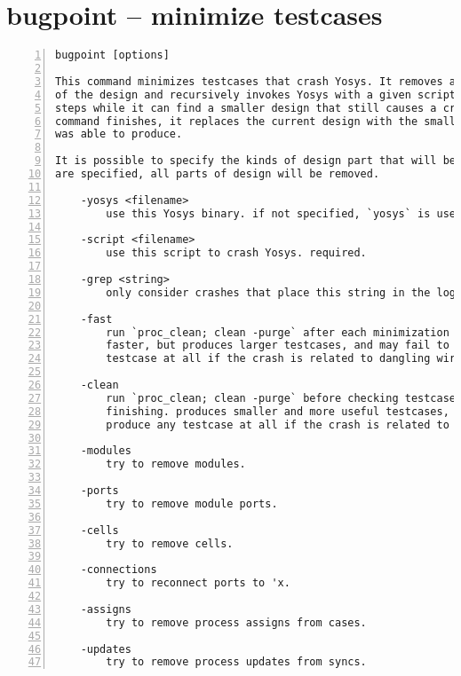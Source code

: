 \section{bugpoint -- minimize testcases}
\label{cmd:bugpoint}
\begin{lstlisting}[numbers=left,frame=single]
    bugpoint [options]

This command minimizes testcases that crash Yosys. It removes an arbitrary part
of the design and recursively invokes Yosys with a given script, repeating these
steps while it can find a smaller design that still causes a crash. Once this
command finishes, it replaces the current design with the smallest testcase it
was able to produce.

It is possible to specify the kinds of design part that will be removed. If none
are specified, all parts of design will be removed.

    -yosys <filename>
        use this Yosys binary. if not specified, `yosys` is used.

    -script <filename>
        use this script to crash Yosys. required.

    -grep <string>
        only consider crashes that place this string in the log file.

    -fast
        run `proc_clean; clean -purge` after each minimization step. converges
        faster, but produces larger testcases, and may fail to produce any
        testcase at all if the crash is related to dangling wires.

    -clean
        run `proc_clean; clean -purge` before checking testcase and after
        finishing. produces smaller and more useful testcases, but may fail to
        produce any testcase at all if the crash is related to dangling wires.

    -modules
        try to remove modules.

    -ports
        try to remove module ports.

    -cells
        try to remove cells.

    -connections
        try to reconnect ports to 'x.

    -assigns
        try to remove process assigns from cases.

    -updates
        try to remove process updates from syncs.
\end{lstlisting}

